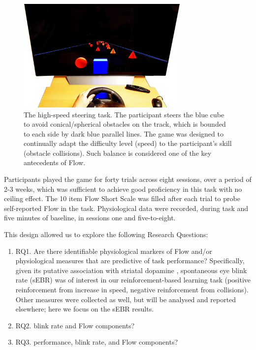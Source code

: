 \documentclass[a4paper,doc,floatsintext,natbib,10pt]{apa6}
\newcommand{\nicewidth}{0.75\textwidth}
\begin{document}
\begin{figure}[!ht]
	\centering
	\includegraphics[width=\nicewidth]{Screenshot_cogcarsim}
	\caption{The high-speed steering task. The participant steers the blue cube to avoid conical/spherical obstacles on the track, which is bounded to each side by dark blue parallel lines. The game was designed to continually adapt the difficulty level (speed) to the participant's skill (obstacle collisions). Such balance is considered one of the key antecedents of Flow.}
	\label{fig:cogcarsim}
\end{figure}

Participants played the game for forty trials across eight sessions, over a period of 2-3 weeks, which was sufficient to achieve good proficiency in this task with no ceiling effect. The 10 item Flow Short Scale \citep{Engeser2008} was filled after each trial to probe self-reported Flow in the task. Physiological data were recorded, during task and five minutes of baseline, in sessions one and five-to-eight.

This design allowed us to explore the following Research Questions:
\begin{enumerate}
	\item RQ1. Are there identifiable physiological markers of Flow and/or physiological measures that are predictive of task performance? Specifically, given its putative association with striatal dopamine \citep{Slagter2012}, spontaneous eye blink rate (sEBR) was of interest in our reinforcement-based learning task (positive reinforcement from increase in speed, negative reinforcement from collisions). Other measures were collected as well, but will be analysed and reported elsewhere; here we focus on the sEBR results.

	\item RQ2. blink rate and Flow components?

	\item RQ3. performance, blink rate, and Flow components?

\end{enumerate}
\end{document}

